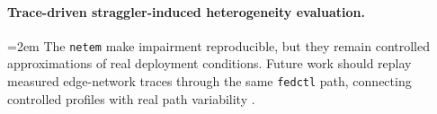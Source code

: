 \paragraph{Trace-driven straggler-induced heterogeneity evaluation.} \hangindent=2em
The \texttt{netem} make impairment reproducible, but they remain controlled approximations of real deployment conditions. Future work should replay measured edge-network traces through the same \texttt{fedctl} path, connecting controlled profiles with real path variability \parencite{bonawitz2019towards,lai2022fedscale}.

